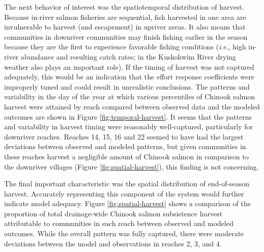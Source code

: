 \documentclass[12pt,]{book}
\theoremstyle{definition}
\theoremstyle{definition}
\theoremstyle{definition}
\theoremstyle{remark}
\begin{document}
The next behavior of interest was the spatiotemporal distribution of
harvest. Because in-river salmon fisheries are sequential, fish
harvested in one area are invulnerable to harvest (and escapement) in
upriver areas. It also means that communities in downriver communities
may finish fishing earlier in the season because they are the first to
experience favorable fishing conditions (\emph{i}.\emph{e}., high
in-river abundance and resulting catch rates; in the Kuskokwim River
drying weather also plays an important role). If the timing of harvest
was not captured adequately, this would be an indication that the effort
response coefficients were improperly tuned and could result in
unrealistic conclusions. The patterns and variability in the day of the
year at which various percentiles of Chinook salmon harvest were
attained by reach compared between observed data and the modeled
outcomes are shown in Figure \ref{fig:temporal-harvest}. It seems that
the patterns and variability in harvest timing were reasonably
well-captured, particularly for downriver reaches. Reaches 14, 15, 16
and 22 seemed to have had the largest deviations between observed and
modeled patterns, but given communities in these reaches harvest a
negligible amount of Chinook salmon in comparison to the downriver
villages (Figure \ref{fig:spatial-harvest}), this finding is not
concerning.

The final important characteristic was the spatial distribution of
end-of-season harvest. Accurately representing this component of the
system would further indicate model adequacy. Figure
\ref{fig:spatial-harvest} shows a comparison of the proportion of total
drainage-wide Chinook salmon subsistence harvest attributable to
communities in each reach between observed and modeled outcomes. While
the overall pattern was fully captured, there were moderate deviations
between the model and observations in reaches 2, 3, and 4.

\clearpage
\end{document}
